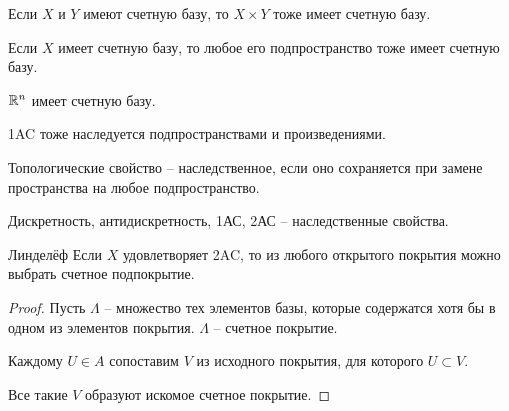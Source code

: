 \documentclass[12pt]{report}
\begin{document}
\begin{thm}
    Если $ X$ и $ Y$ имеют счетную базу, то $ X \times  Y$ тоже имеет счетную базу.
\end{thm}
\begin{thm}
    Если $ X$ имеет счетную базу, то любое его подпространство тоже имеет счетную базу.
\end{thm}
\begin{cor}
    $ \mathbb{R}^{n}$ имеет счетную базу.
\end{cor}
\begin{probl}
    1AC тоже наследуется подпространствами и произведениями.
\end{probl}
\begin{defn}
    Топологические свойство -- наследственное, если оно сохраняется при замене пространства на любое подпространство.
\end{defn}
\begin{ex}
    Дискретность, антидискретность, 1АС, 2АС -- наследственные свойства.
\end{ex}
\begin{thm}{Линделёф}
    Если $ X$ удовлетворяет 2AC, то из любого открытого покрытия можно выбрать счетное подпокрытие.
\end{thm}
\begin{proof}
    Пусть  $ \Lambda $ -- множество тех элементов базы, которые содержатся хотя бы в одном из элементов покрытия. $ \Lambda$ -- счетное покрытие.

    Каждому $ U \in A$ сопоставим $ V$ из исходного покрытия, для которого  $ U \subset V$.

    Все такие $ V$ образуют искомое счетное покрытие.
\end{proof}
\end{document}
